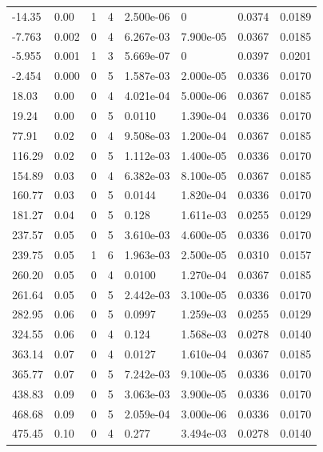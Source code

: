 \documentclass[preview]{standalone}
\begin{document}
{{\begin{tabular}{L{1.2cm}C{1.2cm} C{0.3cm}C{0.5cm} C{1.4cm}C{1.4cm} C{1.4cm}C{1.4cm}}
  -14.35  &  0.00  & 1     &  4 &  2.500e-06  & 0  & 0.0374 &  0.0189   \\ 
  -7.763  &  0.002  & 0     &  4 &  6.267e-03  & 7.900e-05  & 0.0367 &  0.0185   \\ 
  -5.955  &  0.001  & 1     &  3 &  5.669e-07  & 0  & 0.0397 &  0.0201   \\ 
  -2.454  &  0.000  & 0     &  5 &  1.587e-03  & 2.000e-05  & 0.0336 &  0.0170   \\ 
  18.03  &  0.00  & 0     &  4 &  4.021e-04  & 5.000e-06  & 0.0367 &  0.0185   \\ 
  19.24  &  0.00  & 0     &  5 &  0.0110  & 1.390e-04  & 0.0336 &  0.0170   \\ 
  77.91  &  0.02  & 0     &  4 &  9.508e-03  & 1.200e-04  & 0.0367 &  0.0185   \\ 
  116.29  &  0.02  & 0     &  5 &  1.112e-03  & 1.400e-05  & 0.0336 &  0.0170   \\ 
  154.89  &  0.03  & 0     &  4 &  6.382e-03  & 8.100e-05  & 0.0367 &  0.0185   \\ 
  160.77  &  0.03  & 0     &  5 &  0.0144  & 1.820e-04  & 0.0336 &  0.0170   \\ 
  181.27  &  0.04  & 0     &  5 &  0.128  & 1.611e-03  & 0.0255 &  0.0129   \\ 
  237.57  &  0.05  & 0     &  5 &  3.610e-03  & 4.600e-05  & 0.0336 &  0.0170   \\ 
  239.75  &  0.05  & 1     &  6 &  1.963e-03  & 2.500e-05  & 0.0310 &  0.0157   \\ 
  260.20  &  0.05  & 0     &  4 &  0.0100  & 1.270e-04  & 0.0367 &  0.0185   \\ 
  261.64  &  0.05  & 0     &  5 &  2.442e-03  & 3.100e-05  & 0.0336 &  0.0170   \\ 
  282.95  &  0.06  & 0     &  5 &  0.0997  & 1.259e-03  & 0.0255 &  0.0129   \\ 
  324.55  &  0.06  & 0     &  4 &  0.124  & 1.568e-03  & 0.0278 &  0.0140   \\ 
  363.14  &  0.07  & 0     &  4 &  0.0127  & 1.610e-04  & 0.0367 &  0.0185   \\ 
  365.77  &  0.07  & 0     &  5 &  7.242e-03  & 9.100e-05  & 0.0336 &  0.0170   \\ 
  438.83  &  0.09  & 0     &  5 &  3.063e-03  & 3.900e-05  & 0.0336 &  0.0170   \\ 
  468.68  &  0.09  & 0     &  5 &  2.059e-04  & 3.000e-06  & 0.0336 &  0.0170   \\ 
  475.45  &  0.10  & 0     &  4 &  0.277  & 3.494e-03  & 0.0278 &  0.0140   \\ 

\end{tabular}}}
\end{document}
